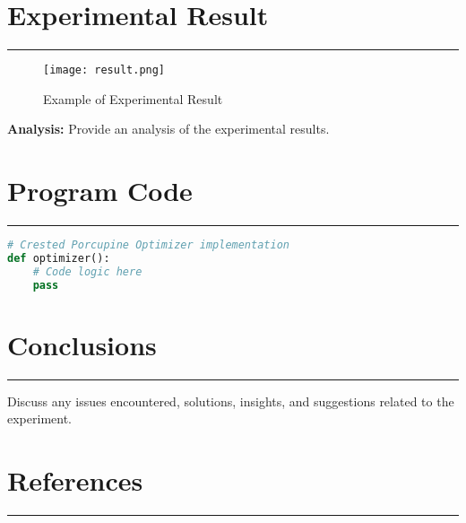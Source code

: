 \documentclass{article}
\newcommand{\sectionline}{%
  \noindent\textcolor{gray}{\rule{\textwidth}{0.5pt}}\par\vspace{1em}
}
\begin{document}
\section{Experimental Result}
\sectionline %
\begin{figure}[H]
    \centering
    \texttt{[image: result.png]}
    \caption{Example of Experimental Result}
\end{figure}

\textbf{Analysis:} Provide an analysis of the experimental results.

\section{Program Code}
\sectionline %
\begin{lstlisting}[language=Python, caption={Sample Code}]
# Crested Porcupine Optimizer implementation
def optimizer():
    # Code logic here
    pass
\end{lstlisting}

\section{Conclusions}
\sectionline %

% 
%

Discuss any issues encountered, solutions, insights, and suggestions related to the experiment. 

\cite{wang2024nuist} %

\section{References}
\sectionline %



\end{document}
